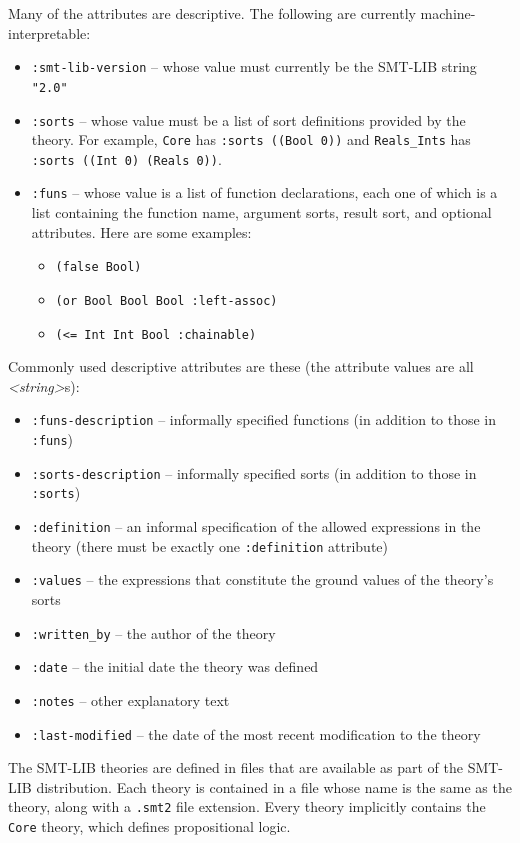 \documentclass[12pt,oneside]{report}
\newcommand{\strng}{{\it <string>}} %
\newcommand{\nospace}{\setlength{\itemsep}{0in}\setlength{\parsep}{0in}\setlength{\parskip}{0in}\setlength{\topsep}{0in}}
\begin{document}
Many of the attributes are descriptive.  The following are currently machine-interpretable:
\begin{itemize} \nospace
\item {\tt :smt-lib-version} -- whose value must currently be the SMT-LIB string {\tt "2.0"}
\item {\tt :sorts} -- whose value must be a list of sort definitions provided by the theory.  For example, 
{\tt Core} has {\tt :sorts ((Bool 0))} and {\tt Reals\_Ints} has {\tt :sorts ((Int 0) (Reals 0))}.
\item {\tt :funs} -- whose value is a list of function declarations, each one of which is a list
containing the function name, argument sorts, result sort, and optional attributes.  Here are some examples:
\begin{itemize} \nospace
\item[] {\tt (false Bool)}
\item[] {\tt (or Bool Bool Bool :left-assoc)}
\item[] {\tt (<= Int Int Bool :chainable)}
\end{itemize}
\end{itemize}

Commonly used descriptive attributes are these (the attribute values are all \strng s):
\begin{itemize}\nospace
\item {\tt :funs-description} -- informally specified functions (in addition to those in {\tt :funs})
\item {\tt :sorts-description} -- informally specified sorts (in addition to those in {\tt :sorts})
\item {\tt :definition} -- an informal specification of the allowed expressions in the theory (there must be exactly one {\tt :definition} attribute)
\item {\tt :values} -- the expressions that constitute the ground values of the theory's sorts
\item {\tt :written\_by} -- the author of the theory
\item {\tt :date} -- the initial date the theory was defined
\item {\tt :notes} -- other explanatory text
\item {\tt :last-modified} -- the date of the most recent modification to the theory

\end{itemize}

The SMT-LIB theories are defined in files that are available as part of the SMT-LIB distribution.  Each theory is
contained in a file whose name is the same as the theory, along with a {\tt .smt2} file extension.
Every theory implicitly contains the {\tt Core} theory, which defines propositional logic.
\end{document}
